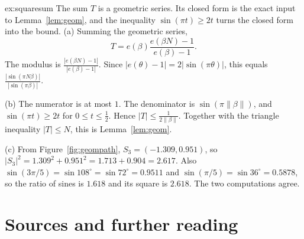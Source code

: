 \begin{solution}{ex:squaresum}
\idea The sum $T$ is a geometric series. Its closed form is the exact input to Lemma~\ref{lem:geom}, and the inequality $\sin(\pi t)\ge2t$ turns the closed form into the bound.
\writeup (a) Summing the geometric series,
\[
T=e(\beta)\frac{e(\beta N)-1}{e(\beta)-1}.
\]
The modulus is $\frac{|e(\beta N)-1|}{|e(\beta)-1|}$. Since $|e(\theta)-1|=2\bigl|\sin(\pi\theta)\bigr|$, this equals $\frac{|\sin(\pi N\beta)|}{|\sin(\pi\beta)|}$.

(b) The numerator is at most $1$. The denominator is $\sin(\pi\|\beta\|)$, and $\sin(\pi t)\ge2t$ for $0\le t\le\frac12$. Hence $|T|\le\frac1{2\|\beta\|}$. Together with the triangle inequality $|T|\le N$, this is Lemma~\ref{lem:geom}.

(c) From Figure~\ref{fig:geompath}, $S_3=(-1.309,0.951)$, so $|S_3|^2=1.309^2+0.951^2=1.713+0.904=2.617$. Also $\sin(3\pi/5)=\sin108^\circ=\sin72^\circ=0.9511$ and $\sin(\pi/5)=\sin36^\circ=0.5878$, so the ratio of sines is $1.618$ and its square is $2.618$. The two computations agree.
\end{solution}

\section*{Sources and further reading}

